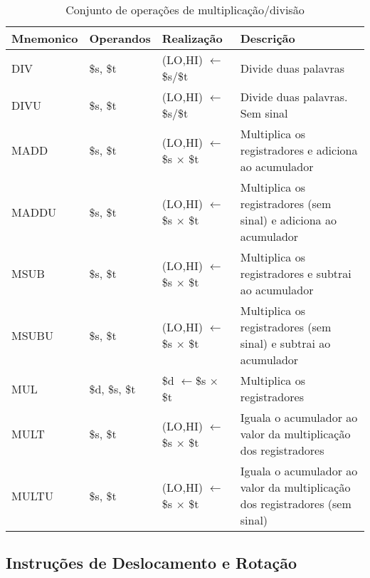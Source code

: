 \documentclass{report}
\begin{document}
    \FloatBarrier
    \begin{table}[H]
      \begin{center}
        \begin{tabular}[pos]{|m{2.8cm}|m{2.8cm}|m{3cm}|m{4cm}|} 
          \hline
          \cellcolor[gray]{0.9}\textbf{Mnemonico} & \cellcolor[gray]{0.9}\textbf{Operandos} & \cellcolor[gray]{0.9}\textbf{Realização} & \cellcolor[gray]{0.9}\textbf{Descrição} \\ \hline
              DIV  & \$s, \$t & (LO,HI) $\leftarrow$\$s/\$t &  Divide duas palavras\\ \hline
              DIVU  &  \$s, \$t & (LO,HI) $\leftarrow$\$s/\$t &  Divide duas palavras. Sem sinal\\ \hline
              MADD  & \$s, \$t& (LO,HI) $\leftarrow$\$s $ \times$ \$t &  Multiplica os registradores e adiciona ao acumulador\\ \hline
              MADDU  &  \$s, \$t & (LO,HI) $\leftarrow$\$s $ \times$ \$t &  Multiplica os registradores (sem sinal) e adiciona ao acumulador\\ \hline
              MSUB  &  \$s, \$t & (LO,HI) $\leftarrow$\$s $ \times$ \$t &  Multiplica os registradores e subtrai ao acumulador\\ \hline
              MSUBU & \$s, \$t & (LO,HI) $\leftarrow$\$s $ \times$ \$t &  Multiplica os registradores (sem sinal) e subtrai ao acumulador\\ \hline
              MUL  &  \$d, \$s, \$t & \$d $\leftarrow$\$s $ \times$ \$t &  Multiplica os registradores \\ \hline
              MULT  & \$s, \$t & (LO,HI) $\leftarrow$\$s $ \times$ \$t &  Iguala o acumulador ao valor da multiplicação dos registradores \\ \hline 
              MULTU  & \$s, \$t & (LO,HI) $\leftarrow$\$s $ \times$ \$t &  Iguala o acumulador ao valor da multiplicação dos registradores (sem sinal)\\ \hline 
            
        \end{tabular}
        \caption{Conjunto de operações de multiplicação/divisão}
		\label{table:conjOpMulDiv}
      \end{center}
    \end{table}
     \subsection{Instruções de Deslocamento e Rotação}
\end{document}
